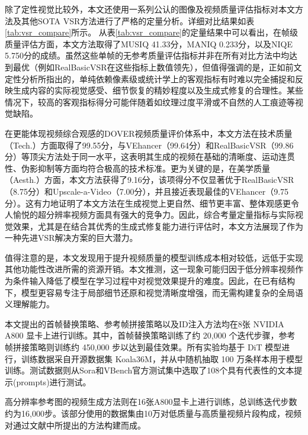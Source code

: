 除了定性视觉比较外，本文还使用一系列公认的图像及视频质量评估指标对本文方法及其他SOTA VSR方法进行了严格的定量分析。详细对比结果如表\ref{tab:vsr_compare}所示。
从表\ref{tab:vsr_compare}的定量结果中可以看出，在帧级质量评估方面，本文方法取得了MUSIQ 41.33分，MANIQ 0.233分，以及NIQE 5.750分的成绩。虽然这些单帧的无参考质量评估指标并非在所有对比方法中均达到最优（例如RealBasicVSR在这些指标上数值领先），但值得强调的是，正如前文定性分析所指出的，单纯依赖像素级或统计学上的客观指标有时难以完全捕捉和反映生成内容的实际视觉感受、细节恢复的精妙程度以及生成式修复的合理性。某些情况下，较高的客观指标得分可能伴随着如纹理过度平滑或不自然的人工痕迹等视觉缺陷。

在更能体现视频综合观感的DOVER视频质量评价体系中，本文方法在技术质量（Tech.）方面取得了99.55分，与VEhancer（99.64分）和RealBasicVSR（99.86分）等顶尖方法处于同一水平，这表明其生成的视频在基础的清晰度、运动连贯性、伪影抑制等方面均符合极高的技术标准。更为关键的是，在美学质量（Aesth.）方面，本文方法获得了9.16分，该项得分不仅显著优于RealBasicVSR（8.75分）和Upscale-a-Video（7.00分），并且接近表现最佳的VEhancer（9.75分）。这有力地证明了本文方法在生成视觉上更自然、细节更丰富、整体观感更令人愉悦的超分辨率视频方面具有强大的竞争力。因此，综合考量定量指标与实际视觉效果，尤其是在结合其优秀的生成式修复能力进行评估时，本文方法展现了作为一种先进VSR解决方案的巨大潜力。

值得注意的是，本文发现用于提升视频质量的模型训练成本相对较低，远低于实现其他功能性改进所需的资源开销。本文推测，这一现象可能归因于低分辨率视频作为条件输入降低了模型在学习过程中对视觉效果提升的难度。因此，在已有结构下，模型更容易专注于局部细节还原和视觉清晰度增强，而无需构建复杂的全局语义理解能力。

本文提出的首帧替换策略、参考帧拼接策略以及ID注入方法均在8张 NVIDIA A800 显卡上进行训练。其中，首帧替换策略训练了约 20,000 个迭代步骤，参考帧拼接策略则训练约 450,000 步以达到最佳效果。所有实验均基于 DiT 模型进行，训练数据采自开源数据集 Koala36M，并从中随机抽取 100 万条样本用于模型训练。测试数据则从Sora和VBench官方测试集中选取了108个具有代表性的文本提示(prompts)进行测试。

高分辨率参考图的视频生成方法则在16张A800显卡上进行训练，总训练迭代步数约为16,000步。该部分使用的数据集由10万对低质量与高质量视频片段构成，视频对通过文献\cite{wang2021real}中所提出的方法构建而成。

